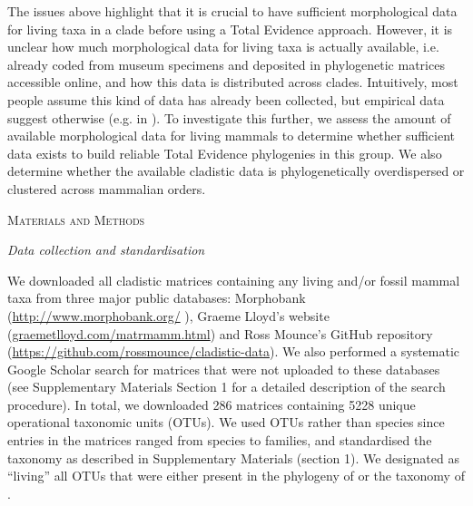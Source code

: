 \documentclass[12pt,letterpaper]{article}
\renewcommand{\section}[1]{%
\bigskip
\begin{center}
\begin{Large}
\normalfont\scshape #1
\medskip
\end{Large}
\end{center}}
\renewcommand{\subsection}[1]{%
\bigskip
\begin{center}
\begin{large}
\normalfont\itshape #1
\end{large}
\end{center}}
\begin{document}
The issues above highlight that it is crucial to have sufficient morphological data for living taxa in a clade before using a Total Evidence approach.
However, it is unclear how much morphological data for living taxa is actually available, i.e. already coded from museum specimens and deposited in phylogenetic matrices accessible online, and how this data is distributed across clades.
Intuitively, most people assume this kind of data has already been collected, but empirical data suggest otherwise (e.g. in \cite{ronquista2012,slaterphylogenetic2013,beckancient2014}).
To investigate this further, we assess the amount of available morphological data for living mammals to determine whether sufficient data exists to build reliable Total Evidence phylogenies in this group.
We also determine whether the available cladistic data is phylogenetically overdispersed or clustered across mammalian orders.

%
%
\section{Materials and Methods}
\subsection{Data collection and standardisation}
We downloaded all cladistic matrices containing any living and/or fossil mammal taxa from three major public databases: Morphobank (\url{http://www.morphobank.org/} \cite{morphobank}), Graeme Lloyd's website (\url{graemetlloyd.com/matrmamm.html}) and Ross Mounce's GitHub repository (\url{https://github.com/rossmounce/cladistic-data}).
We also performed a systematic Google Scholar search for matrices that were not uploaded to these databases (see Supplementary Materials Section 1 for a detailed description of the search procedure).
In total, we downloaded 286 matrices containing 5228 unique operational taxonomic units (OTUs). 
We used OTUs rather than species since entries in the matrices ranged from species to families, and standardised the taxonomy as described in Supplementary Materials (section 1). 
We designated as ``living'' all OTUs that were either present in the phylogeny of \cite{BinindaEmonds} or the taxonomy of \cite{wilson2005mammal}.
\end{document}
